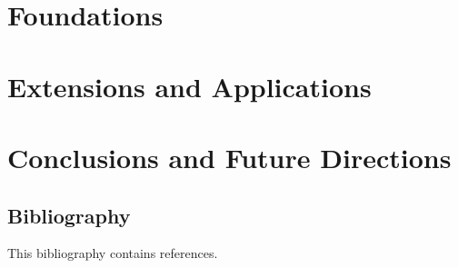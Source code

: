 \documentclass[12pt,masters]{cmuthesis}
\begin{document}
\part{Foundations}



\part{Extensions and Applications}


\part{Conclusions and Future Directions}


\chapter*{Bibliography}

\vspace{-25mm}
This bibliography contains  references.
\vspace{10mm}

\printbibliography[heading=none]
\end{document}
